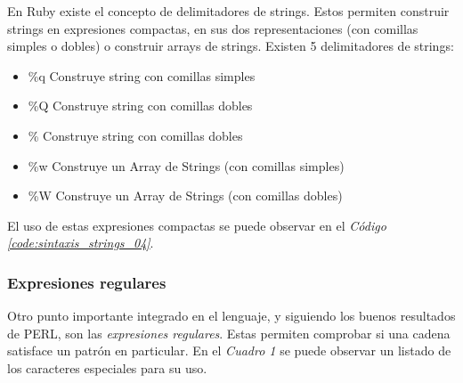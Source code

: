 \documentclass{article}
\newcommand{\refcode}[1]{\textit{Código \ref{#1}}}
\begin{document}
 
\bigskip

	En Ruby existe el concepto de delimitadores de strings. Estos permiten construir strings en expresiones compactas, en sus dos representaciones (con comillas simples o dobles) o construir arrays de strings. Existen 5 delimitadores de strings:
\bigskip

\begin{itemize}
	\itemsep=1pt \topsep=0pt \partopsep=0pt \parskip=0pt \parsep=0pt
	\item  \%q	Construye string con comillas simples
	\item  \%Q	Construye string con comillas dobles
	\item  \%        Construye string con comillas dobles
	\item \%w	Construye un Array de Strings (con comillas simples)
	\item  \%W     Construye un Array de Strings (con comillas dobles)
\end{itemize}
	

\noindent El uso de estas expresiones compactas se puede observar en el \refcode{code:sintaxis_strings_04}.

 
\bigskip



\subsubsection{Expresiones regulares}
Otro punto importante integrado en el lenguaje, y siguiendo los buenos resultados de PERL, son las \textit{expresiones regulares}. Estas permiten comprobar si una cadena satisface un patrón en particular. En el \textit{Cuadro 1} se puede observar un listado de los caracteres especiales para su uso.\\
\end{document}
